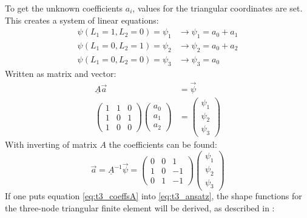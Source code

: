   To get the unknown coefficients $a_i$, values for the triangular coordinates are set. This creates a system of linear equations:
  \begin{align}
  \psi(L_1=1, L_2=0) = \psi_1 &\rightarrow \psi_1 = a_0 + a_1 \nonumber\\
  \psi(L_1=0, L_2=1) = \psi_2 &\rightarrow \psi_2 = a_0 + a_2 \nonumber\\
  \psi(L_1=0, L_2=0) = \psi_3 &\rightarrow \psi_3 = a_0
  \end{align}
  Written as matrix and vector:
  \begin{align}
  \underline{A} \vec{a} &= \vec{\psi} \nonumber\\
  \begin{pmatrix}
  1 & 1 & 0\\
  1 & 0 & 1\\
  1 & 0 & 0
  \end{pmatrix} \begin{pmatrix}
  a_0 \\ a_1 \\ a_2
  \end{pmatrix} &= \begin{pmatrix}
  \psi_1 \\ \psi_2 \\ \psi_3
  \end{pmatrix}
  \end{align}
  With inverting of matrix $A$ the coefficients can be found:
  \begin{equation}\label{eq:t3_coeffsA}
  \vec{a} = \underline{A}^{-1} \vec{\psi} = \begin{pmatrix}
  0 & 0 & 1\\
  1 & 0 & -1\\
  0 & 1 & -1
  \end{pmatrix} \begin{pmatrix}
  \psi_1 \\ \psi_2 \\ \psi_3
  \end{pmatrix}
  \end{equation}
  If one puts equation \eqref{eq:t3_coeffsA} into \eqref{eq:t3_ansatz}, the shape functions for the three-node triangular finite element will be derived, as described in \cite{steinke2005finite}:
